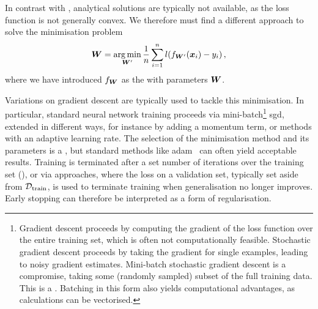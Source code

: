 In contrast with \krr, analytical solutions are typically not available, as the loss function is not generally convex. We therefore must find a different approach to solve the minimisation problem
\begin{equation}
	\boldsymbol{W} = \operatorname*{arg\,min}_{\boldsymbol{W}'} \frac{1}{n} \sum_{i=1}^{n} l(f_{\boldsymbol{W}'}(\boldsymbol{x}_i) - y_i) \, ,
\end{equation}
where we have introduced $f_{\boldsymbol{W}}$ as the \nn with parameters $\boldsymbol{W}$.

Variations on gradient descent are typically used to tackle this minimisation. In particular, standard neural network training proceeds via mini-batch\footnote[][-3\baselineskip]{Gradient descent proceeds by computing the gradient of the loss function over the entire training set, which is often not computationally feasible. Stochastic gradient descent proceeds by taking the gradient for single examples, leading to noisy gradient estimates. Mini-batch stochastic gradient descent is a compromise, taking some (randomly sampled) subset of the full training data. This  is a \hp. Batching in this form also yields computational advantages, as calculations can be vectorised.} \gls{sgd}, extended in different ways, for instance by adding a momentum term, or methods with an adaptive learning rate.
The selection of the minimisation method and its parameters is a \hp, but standard methods like \gls{adam}~\cite{kb2014m} can often yield acceptable results.
Training is terminated after a set number of iterations over the training set (), or via  approaches, where the loss on a validation set, typically set aside from $\mathcal{D}_{\text{train}}$, is used to terminate training when generalisation no longer improves. Early stopping can therefore be interpreted as a form of regularisation.



